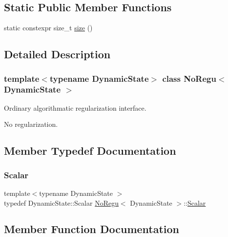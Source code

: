 \subsection*{Static Public Member Functions}
\begin{DoxyCompactItemize}
\item 
static constexpr size\+\_\+t \mbox{\hyperlink{class_no_regu_ade4184183a8b2c2095831f3a54e1836a}{size}} ()
\end{DoxyCompactItemize}


\subsection{Detailed Description}
\subsubsection*{template$<$typename Dynamic\+State$>$\newline
class No\+Regu$<$ Dynamic\+State $>$}

Ordinary algorithmatic regularization interface. 

No regularization. 

\subsection{Member Typedef Documentation}
\mbox{\label{class_no_regu_aa6d40425c316da9c24b55bc908d3cd14}} 
\subsubsection{\texorpdfstring{Scalar}{Scalar}}
{\footnotesize\ttfamily template$<$typename Dynamic\+State $>$ \\
typedef Dynamic\+State\+::\+Scalar \mbox{\hyperlink{class_no_regu}{No\+Regu}}$<$ Dynamic\+State $>$\+::\mbox{\hyperlink{class_no_regu_aa6d40425c316da9c24b55bc908d3cd14}{Scalar}}}



\subsection{Member Function Documentation}
\mbox{\label{class_no_regu_a0c365c1758907b76ee8bf5138f3b20be}} 
